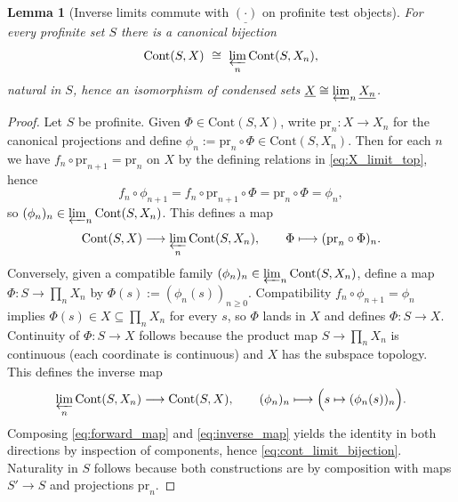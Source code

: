 \documentclass[11pt]{article}
\newtheorem{lemma}[theorem]{Lemma}
\theoremstyle{remark}
\begin{document}
{\begin{lemma}[Inverse limits commute with $\underline{(\cdot)}$ on profinite test objects]\label{lem:limit_commutes_with_underline}
For every profinite set $S$ there is a canonical bijection
\begin{equation}\label{eq:cont_limit_bijection}
\mathrm{Cont}(S,X)\ \cong\ \varprojlim_n \mathrm{Cont}(S,X_n),
\end{equation}
natural in $S$, hence an isomorphism of condensed sets $\underline{X}\cong \varprojlim_n \underline{X_n}$.
\end{lemma}
\begin{proof}
Let $S$ be profinite. Given $\Phi\in \mathrm{Cont}(S,X)$, write $\mathrm{pr}_n:X\to X_n$ for the canonical projections and define $\phi_n:=\mathrm{pr}_n\circ \Phi\in \mathrm{Cont}(S,X_n)$. Then for each $n$ we have $f_n\circ \mathrm{pr}_{n+1}=\mathrm{pr}_n$ on $X$ by the defining relations in \eqref{eq:X_limit_top}, hence
\begin{equation}\label{eq:compat_from_phi}
f_n\circ \phi_{n+1}=f_n\circ \mathrm{pr}_{n+1}\circ \Phi=\mathrm{pr}_n\circ \Phi=\phi_n,
\end{equation}
so $(\phi_n)_n\in \varprojlim_n \mathrm{Cont}(S,X_n)$. This defines a map
\begin{equation}\label{eq:forward_map}
\mathrm{Cont}(S,X)\longrightarrow \varprojlim_n \mathrm{Cont}(S,X_n),\qquad \Phi\longmapsto (\mathrm{pr}_n\circ \Phi)_n.
\end{equation}
Conversely, given a compatible family $(\phi_n)_n\in \varprojlim_n \mathrm{Cont}(S,X_n)$, define a map $\Phi:S\to \prod_n X_n$ by $\Phi(s):=(\phi_n(s))_{n\ge 0}$. Compatibility $f_n\circ \phi_{n+1}=\phi_n$ implies $\Phi(s)\in X\subseteq \prod_n X_n$ for every $s$, so $\Phi$ lands in $X$ and defines $\Phi:S\to X$. Continuity of $\Phi:S\to X$ follows because the product map $S\to\prod_n X_n$ is continuous (each coordinate is continuous) and $X$ has the subspace topology. This defines the inverse map
\begin{equation}\label{eq:inverse_map}
\varprojlim_n \mathrm{Cont}(S,X_n)\longrightarrow \mathrm{Cont}(S,X),\qquad (\phi_n)_n\longmapsto \Bigl(s\mapsto (\phi_n(s))_n\Bigr).
\end{equation}
Composing \eqref{eq:forward_map} and \eqref{eq:inverse_map} yields the identity in both directions by inspection of components, hence \eqref{eq:cont_limit_bijection}. Naturality in $S$ follows because both constructions are by composition with maps $S'\to S$ and projections $\mathrm{pr}_n$.
\end{proof}

}
\end{document}
